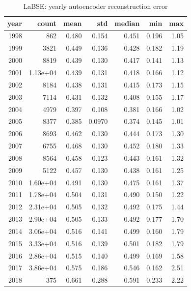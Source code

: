\begin{table}[ht]
\centering
\caption{LaBSE: yearly autoencoder reconstruction error}
\label{tab:labse_ae_all_years}
\begin{tabular}{rrrrrrr}
\toprule
year & count & mean & std & median & min & max \\
\midrule
1998 & 862 & 0.480 & 0.154 & 0.451 & 0.196 & 1.05 \\
1999 & 3821 & 0.449 & 0.136 & 0.428 & 0.182 & 1.19 \\
2000 & 8819 & 0.439 & 0.130 & 0.417 & 0.141 & 1.13 \\
2001 & 1.13e+04 & 0.439 & 0.131 & 0.418 & 0.166 & 1.12 \\
2002 & 8184 & 0.438 & 0.131 & 0.415 & 0.173 & 1.15 \\
2003 & 7114 & 0.431 & 0.132 & 0.408 & 0.155 & 1.17 \\
2004 & 4979 & 0.397 & 0.108 & 0.381 & 0.166 & 1.02 \\
2005 & 8377 & 0.385 & 0.0970 & 0.374 & 0.145 & 1.01 \\
2006 & 8693 & 0.462 & 0.130 & 0.444 & 0.173 & 1.30 \\
2007 & 6755 & 0.468 & 0.130 & 0.452 & 0.180 & 1.33 \\
2008 & 8564 & 0.458 & 0.123 & 0.443 & 0.161 & 1.32 \\
2009 & 5122 & 0.457 & 0.130 & 0.438 & 0.161 & 1.25 \\
2010 & 1.60e+04 & 0.491 & 0.130 & 0.475 & 0.161 & 1.37 \\
2011 & 1.78e+04 & 0.504 & 0.131 & 0.490 & 0.150 & 1.22 \\
2012 & 2.31e+04 & 0.505 & 0.132 & 0.492 & 0.175 & 1.44 \\
2013 & 2.90e+04 & 0.505 & 0.133 & 0.492 & 0.177 & 1.70 \\
2014 & 3.06e+04 & 0.516 & 0.141 & 0.499 & 0.160 & 1.79 \\
2015 & 3.33e+04 & 0.516 & 0.139 & 0.501 & 0.182 & 1.79 \\
2016 & 2.86e+04 & 0.515 & 0.140 & 0.499 & 0.169 & 1.58 \\
2017 & 3.86e+04 & 0.575 & 0.186 & 0.546 & 0.162 & 2.51 \\
2018 & 375 & 0.661 & 0.288 & 0.591 & 0.233 & 2.22 \\
\bottomrule
\end{tabular}
\end{table}
